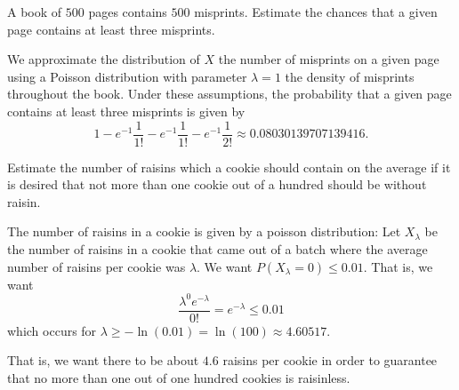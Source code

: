 \begin{problem}[Handout 10, \# 8]
  A book of \(500\) pages contains \(500\) misprints. Estimate the chances
  that a given page contains at least three misprints.
\end{problem}
\begin{solution}
  We approximate the distribution of \(X\) the number of misprints on a
  given page using a Poisson distribution with parameter \(\lambda=1\) the
  density of misprints throughout the book. Under these assumptions, the
  probability that a given page contains at least three misprints is given
  by
  \[
    1-e^{-1}\frac{1}{1!}-e^{-1}\frac{1}{1!}-e^{-1}\frac{1}{2!}
    \approx\num{0.08030139707139416}.
  \]
\end{solution}
\newpage

\begin{problem}[Handout 10, \# 9]
  Estimate the number of raisins which a cookie should contain on the
  average if it is desired that not more than one cookie out of a hundred
  should be without raisin.
\end{problem}
\begin{solution}
  The number of raisins in a cookie is given by a poisson distribution: Let
  $X_{\lambda}$ be the number of raisins in a cookie that came out of a batch
  where the average number of raisins per cookie was $\lambda$. We want
  $P(X_{\lambda} = 0) \leq 0.01$. That is, we want
  \[
    \frac{\lambda^0 e^{-\lambda}}{0!} = e^{-\lambda} \leq 0.01
  \]
  which occurs for
  $\lambda \geq -\ln(0.01) = \ln(100) \approx \num{4.60517}$.

  That is, we want there to be about $4.6$ raisins per cookie in order to
  guarantee that no more than one out of one hundred cookies is raisinless.
\end{solution}
\newpage

